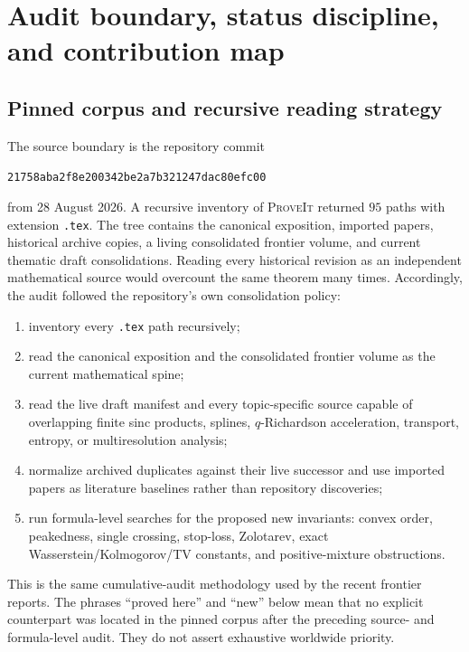 \documentclass[11pt,oneside]{article}
\numberwithin{equation}{section}
\theoremstyle{definition}
\theoremstyle{remark}
\newcommand{\repo}{\textsc{ProveIt}}
\begin{document}
\section{Audit boundary, status discipline, and contribution map}
\label{p5:sec:audit}

\subsection{Pinned corpus and recursive reading strategy}

The source boundary is the repository commit
\begin{center}
\texttt{21758aba2f8e200342be2a7b321247dac80efc00}
\end{center}
from 28 August 2026.  A recursive inventory of \repo{} returned $95$ paths with extension \texttt{.tex}.  The tree contains the canonical exposition, imported papers, historical archive copies, a living consolidated frontier volume, and current thematic draft consolidations.  Reading every historical revision as an independent mathematical source would overcount the same theorem many times.  Accordingly, the audit followed the repository's own consolidation policy:

\begin{enumerate}
\item inventory every \texttt{.tex} path recursively;
\item read the canonical exposition and the consolidated frontier volume as the current mathematical spine;
\item read the live draft manifest and every topic-specific source capable of overlapping finite sinc products, splines, $q$-Richardson acceleration, transport, entropy, or multiresolution analysis;
\item normalize archived duplicates against their live successor and use imported papers as literature baselines rather than repository discoveries;
\item run formula-level searches for the proposed new invariants: convex order, peakedness, single crossing, stop-loss, Zolotarev, exact Wasserstein/Kolmogorov/TV constants, and positive-mixture obstructions.
\end{enumerate}

This is the same cumulative-audit methodology used by the recent frontier reports.  The phrases ``proved here'' and ``new'' below mean that no explicit counterpart was located in the pinned corpus after the preceding source- and formula-level audit.  They do not assert exhaustive worldwide priority.
\end{document}
